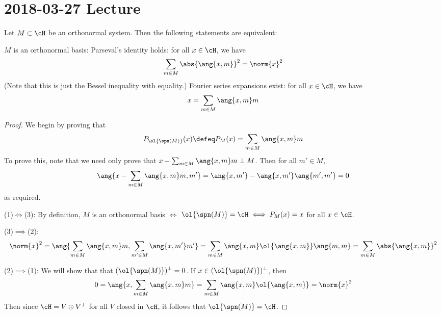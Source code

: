 \section{2018-03-27 Lecture}

\begin{thm}
	Let $M \subset \cH$ be an orthonormal system.
	Then the following statements are equivalent:
	\begin{enum}
		\io $M$ is an orthonormal basis:
		\io Parseval's identity holds: for all $x \in \cH$, we have
		\[\sum_{m \in M} \abs{\ang{x,m}}^2 = \norm{x}^2\]
		(Note that this is just the Bessel inequality with equality.)
		\io Fourier series expansions exist: for all $x \in \cH$, we have
		\[x = \sum_{m \in M} \ang{x,m} m\]
	\end{enum}
\end{thm}

\begin{proof}
	We begin by proving that
	\[P_{\ol{\spn(M)}}(x) \defeq P_M(x) = \sum_{m \in M} \ang{x,m}m\]
	To prove this, note that we need only prove that $x-\sum_{m \in M} \ang{x,m}m \perp M$.
	Then for all $m' \in M$,
	\[\ang{x-\sum_{m \in M} \ang{x,m}m,m'} = \ang{x,m'}-\ang{x,m'}\ang{m',m'}=0\]
	as required.
	
	(1)$\iff$(3): By definition, $M$ is an orthonormal basis $\iff$ $\ol{\spn(M)}=\cH \iff P_M(x)=x$ for all $x \in \cH$.
	
	(3)$\implies$(2):
	\[\norm{x}^2 = \ang{\sum_{m \in M} \ang{x,m}m,\sum_{m' \in M} \ang{x,m'}m'} = \sum_{m \in M} \ang{x,m} \ol{\ang{x,m}} \ang{m,m} = \sum_{m \in M} \abs{\ang{x,m}}^2\]
	
	(2)$\implies$(1):
	We will show that that $(\ol{\spn(M)})^\perp=0$.
	If $x \in (\ol{\spn(M)})^\perp$, then
	\[0 = \ang{x,\sum_{m \in M} \ang{x,m}m} = \sum_{m \in M} \ang{x,m} \ol{\ang{x,m}} = \norm{x}^2\]
	Then since $\cH = V \oplus V^\perp$ for all $V$ closed in $\cH$, it follows that $\ol{\spn(M)} = \cH$.
\end{proof}

